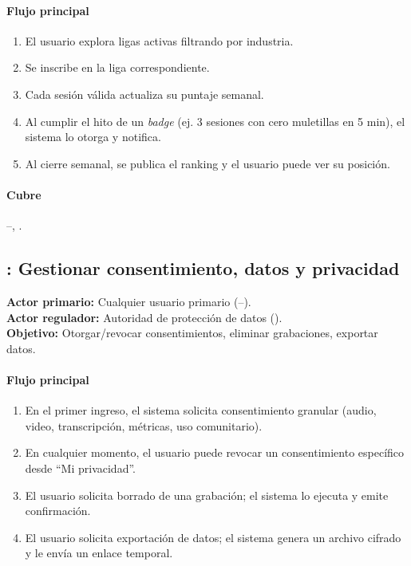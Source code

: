 \paragraph{Flujo principal}
\begin{enumerate}
  \item El usuario explora ligas activas filtrando por industria.
  \item Se inscribe en la liga correspondiente.
  \item Cada sesión válida actualiza su puntaje semanal.
  \item Al cumplir el hito de un \textit{badge} (ej. 3 sesiones con
        cero muletillas en 5 min), el sistema lo otorga y notifica.
  \item Al cierre semanal, se publica el ranking y el usuario puede
        ver su posición.
\end{enumerate}

\paragraph{Cubre} --, .

\subsection{: Gestionar consentimiento, datos y privacidad}
\begin{cajaCriterio}
\textbf{Actor primario:} Cualquier usuario primario (--). \\
\textbf{Actor regulador:} Autoridad de protección de datos (). \\
\textbf{Objetivo:} Otorgar/revocar consentimientos, eliminar grabaciones,
exportar datos.
\end{cajaCriterio}

\paragraph{Flujo principal}
\begin{enumerate}
  \item En el primer ingreso, el sistema solicita consentimiento granular
        (audio, video, transcripción, métricas, uso comunitario).
  \item En cualquier momento, el usuario puede revocar un consentimiento
        específico desde ``Mi privacidad''.
  \item El usuario solicita borrado de una grabación; el sistema lo
        ejecuta y emite confirmación.
  \item El usuario solicita exportación de datos; el sistema genera un
        archivo cifrado y le envía un enlace temporal.
\end{enumerate}

